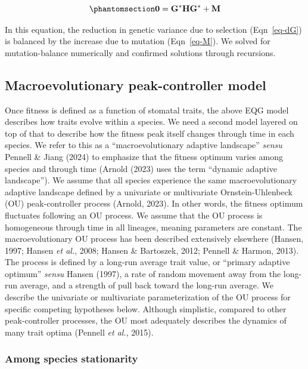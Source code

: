 \documentclass[
  letterpaper,
  DIV=11,
  numbers=noendperiod]{scrartcl}
\begin{document}
\begin{equation}\phantomsection\label{eq-Gstar}{\mathbf{0} = \mathbf{G}^*\mathbf{H}\mathbf{G}^* + \mathbf{M}}\end{equation}

In this equation, the reduction in genetic variance due to selection
(Eqn~\ref{eq-dG}) is balanced by the increase due to mutation
(Eqn~\ref{eq-M}). We solved for mutation-balance numerically and
confirmed solutions through recursions.

\subsection{Macroevolutionary peak-controller
model}\label{macroevolutionary-peak-controller-model}

Once fitness is defined as a function of stomatal traits, the above EQG
model describes how traits evolve within a species. We need a second
model layered on top of that to describe how the fitness peak itself
changes through time in each species. We refer to this as a
``macroevolutionary adaptive landscape'' \emph{sensu} Pennell \& Jiang
(2024) to emphasize that the fitness optimum varies among species and
through time (Arnold (2023) uses the term ``dynamic adaptive
landscape''). We assume that all species experience the same
macroevolutionary adaptive landscape defined by a univariate or
multivariate Ornstein-Uhlenbeck (OU) peak-controller process (Arnold,
2023). In other words, the fitness optimum fluctuates following an OU
process. We assume that the OU process is homogeneous through time in
all lineages, meaning parameters are constant. The macroevolutionary OU
process has been described extensively elsewhere (Hansen, 1997; Hansen
\emph{et al.}, 2008; Hansen \& Bartoszek, 2012; Pennell \& Harmon,
2013). The process is defined by a long-run average trait value, or
``primary adaptive optimum'' \emph{sensu} Hansen (1997), a rate of
random movement away from the long-run average, and a strength of pull
back toward the long-run average. We describe the univariate or
multivariate parameterization of the OU process for specific competing
hypotheses below. Although simplistic, compared to other peak-controller
processes, the OU most adequately describes the dynamics of many trait
optima (Pennell \emph{et al.}, 2015).

\subsubsection{Among species
stationarity}\label{among-species-stationarity}
\end{document}
